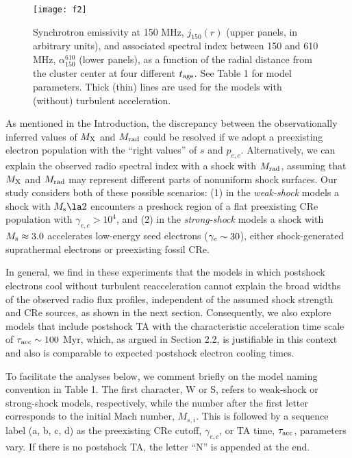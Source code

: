 \documentclass[twocolumn]{aastex61}
\begin{document}
\begin{figure*}[t]
\vspace{-1cm}
\hspace{-0.2cm}
\texttt{[image: f2]}
\vspace{-6.0cm}
\caption{
Synchrotron emissivity at 150 MHz, $j_{150}(r)$ (upper panels, in arbitrary units), 
and associated spectral index between 150 and 610 MHz, $\alpha_{150}^{610}$ (lower panels),
as a function of the radial distance from the cluster center at four different $t_{\rm age}$.
See Table 1 for model parameters. 
Thick (thin) lines are used for the models with (without) turbulent acceleration.}
\label{Fig2}
\end{figure*}

As mentioned in the Introduction, 
the discrepancy between the observationally inferred values of $M_{\rm X}$ and $M_{\rm rad}$ could be resolved
if we adopt a preexisting electron population with the ``right values'' of $s$ and $p_{e,c}$.
Alternatively, we can explain the observed radio spectral index with a shock with $M_{\rm rad}$, 
assuming that $M_{\rm X}$ and $M_{\rm rad}$ may represent different parts of nonuniform shock surfaces.
Our study considers both of these possible scenarios: 
(1) in the {\it  weak-shock} models a shock with $M_{\rm s} \la 2$ encounters a preshock region of 
a flat preexisting CRe population with $\gamma_{e,c}>10^4$,
and (2) in the {\it strong-shock} models a shock with $M_{\rm s}\approx 3.0$ accelerates low-energy seed
electrons ($\gamma_{\rm e}\sim 30$), either shock-generated suprathermal electrons
or preexisting fossil CRe.

In general, we find in these experiments that the models in which postshock electrons cool without turbulent reacceleration cannot explain the 
broad widths of the observed radio flux profiles, independent of the assumed shock strength and CRe sources, as shown in the next section.
Consequently, we also explore models that include postshock TA with the characteristic acceleration time scale of
$\tau_{\rm acc} \sim100$ Myr, which, as argued in Section 2.2, is justifiable in this context and also is comparable to expected postshock electron cooling times.

To facilitate the analyses below, we comment briefly on the model naming convention in Table 1.
The first character, W or S, refers to weak-shock or strong-shock models, respectively,
while the number after the first letter corresponds to the initial Mach number, $M_{s,i}$.
This is followed by a sequence label (a, b, c, d) as the preexisting CRe cutoff, $\gamma_{e,c}$, 
or TA time, $\tau_{\rm acc}$, parameters vary. 
If there is no postshock TA, the letter ``N'' is appended at the end.
 
\end{document}

